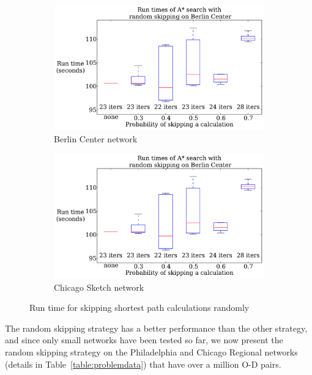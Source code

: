 \begin{figure}[t]
    \centering
    \begin{subfigure}{.5\textwidth}
        \centering
        \includegraphics[page=1,width=\textwidth]{img/random_time}
        \caption{Berlin Center network}
        \label{fig:berlin_random_n}
    \end{subfigure}%
    \begin{subfigure}{.5\textwidth}
        \centering
        \includegraphics[page=2,width=\textwidth]{img/random_time}
        \caption{Chicago Sketch network}
        \label{fig:chicago_random_n}
    \end{subfigure}
    \caption{Run time for skipping shortest path calculations randomly}
    \label{fig:random_n}
\end{figure}

The random skipping strategy has a better performance than the other strategy,
and since only small networks have been tested so far,
we now present the random skipping strategy on the Philadelphia and Chicago Regional networks (details in Table~\ref{table:problemdata}) that have over a million O-D pairs.

